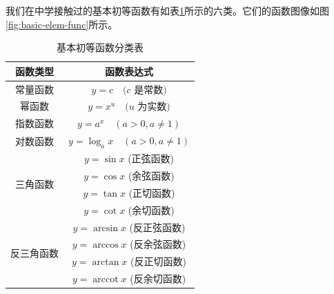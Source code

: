 \documentclass[lang=cn,newtx,10pt,scheme=chinese]{elegantbook}
\begin{document}
我们在中学接触过的基本初等函数有如表\ref{tab:基本初等函数分类表}所示的六类。它们的函数图像如图\ref{fig:basic-elem-func}所示。

\begin{table}[h]
\caption{基本初等函数分类表}
\centering
\renewcommand{\arraystretch}{1.5} %
\begin{tabular}{c|c}
\hline
\rowcolor{gray!50}
\textbf{函数类型} & \textbf{函数表达式} \\
\hline
常量函数 & $y=c \quad (c$ 是常数$)$ \\
\hline
幂函数 & $y=x^u \quad (u$ 为实数$)$ \\
\hline
指数函数 & $y=a^x \quad (a>0, a \neq 1)$ \\
\hline
对数函数 & $y=\log_a x \quad (a>0, a \neq 1)$ \\
\hline
\multirow{4}{*}{三角函数} & $y=\sin x$ (正弦函数) \\
 & $y=\cos x$ (余弦函数) \\
 & $y=\tan x$ (正切函数) \\
 & $y=\cot x$ (余切函数) \\
\hline
\multirow{4}{*}{反三角函数} & $y=\arcsin x$ (反正弦函数) \\
 & $y=\arccos x$ (反余弦函数) \\
 & $y=\arctan x$ (反正切函数) \\
 & $y=\operatorname{arccot} x$ (反余切函数) \\
\hline
\end{tabular}
\label{tab:基本初等函数分类表}
\end{table}
\end{document}
